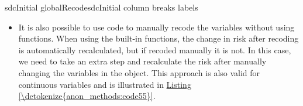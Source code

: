 \documentclass[letterpaper,10pt,english]{sphinxmanual}
\begin{document}
\def\sphinxLiteralBlockLabel{\label{\detokenize{anon_methods:code54}}}
%
\begin{sphinxVerbatim}[commandchars=\\\{\},numbers=left,firstnumber=1,stepnumber=1]
   sdcInitial  globalRecodesdcInitial column   breaks      labels  \PYG{l+s}{[0,15)\PYGZsq{}} \PYG{l+s}{[15,65)\PYGZsq{}} \PYG{l+s}{[65,100)\PYGZsq{}}
\end{sphinxVerbatim}
\begin{itemize}
\item {} 
It is also possible to use  code to manually recode the variables
without using  functions. When using the built-in
 functions, the change in risk after recoding is
automatically recalculated, but if recoded manually it is not. In
this case, we need to take an extra step and recalculate the risk
after manually changing the variables in the  object. This
approach is also valid for continuous variables and is illustrated in
\hyperref[\detokenize{anon_methods:code55}]{Listing \ref{\detokenize{anon_methods:code55}}}.

\end{itemize}
\end{document}
